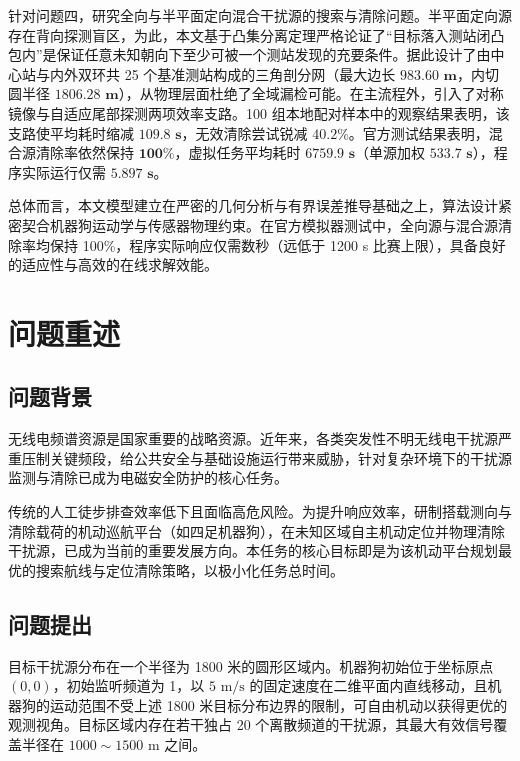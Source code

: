 \documentclass[zihao=-4,a4paper,UTF8]{ctexart}
\begin{document}
\begin{cumcmabstract}
针对问题四，研究全向与半平面定向混合干扰源的搜索与清除问题。半平面定向源存在背向探测盲区，为此，本文基于凸集分离定理严格论证了“目标落入测站闭凸包内”是保证任意未知朝向下至少可被一个测站发现的充要条件。据此设计了由中心站与内外双环共 25 个基准测站构成的三角剖分网（最大边长 $\mathbf{983.60\text{ m}}$，内切圆半径 $\mathbf{1806.28\text{ m}}$），从物理层面杜绝了全域漏检可能。在主流程外，引入了对称镜像与自适应尾部探测两项效率支路。100 组本地配对样本中的观察结果表明，该支路使平均耗时缩减 $\mathbf{109.8\text{ s}}$，无效清除尝试锐减 $\mathbf{40.2\%}$。官方测试结果表明，混合源清除率依然保持 $\mathbf{100\%}$，虚拟任务平均耗时 $\mathbf{6759.9\text{ s}}$（单源加权 $\mathbf{533.7\text{ s}}$），程序实际运行仅需 $\mathbf{5.897\text{ s}}$。

总体而言，本文模型建立在严密的几何分析与有界误差推导基础之上，算法设计紧密契合机器狗运动学与传感器物理约束。在官方模拟器测试中，全向源与混合源清除率均保持 100\%，程序实际响应仅需数秒（远低于 1200 s 比赛上限），具备良好的适应性与高效的在线求解效能。

\vspace{-0.4em}
\end{cumcmabstract}

\section{问题重述}

\subsection{问题背景}

无线电频谱资源是国家重要的战略资源。近年来，各类突发性不明无线电干扰源严重压制关键频段，给公共安全与基础设施运行带来威胁，针对复杂环境下的干扰源监测与清除已成为电磁安全防护的核心任务。

传统的人工徒步排查效率低下且面临高危风险。为提升响应效率，研制搭载测向与清除载荷的机动巡航平台（如四足机器狗），在未知区域自主机动定位并物理清除干扰源，已成为当前的重要发展方向。本任务的核心目标即是为该机动平台规划最优的搜索航线与定位清除策略，以极小化任务总时间。

\subsection{问题提出}

目标干扰源分布在一个半径为 1800 米的圆形区域内。机器狗初始位于坐标原点 $(0,0)$，初始监听频道为 1，以 $5\text{ m/s}$ 的固定速度在二维平面内直线移动，且机器狗的运动范围不受上述 1800 米目标分布边界的限制，可自由机动以获得更优的观测视角。目标区域内存在若干独占 20 个离散频道的干扰源，其最大有效信号覆盖半径在 $1000\sim 1500\text{ m}$ 之间。
\end{document}
